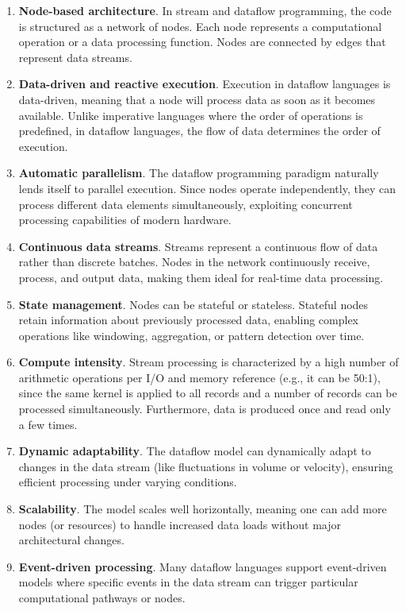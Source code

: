 \documentclass[11pt, reqno]{amsart}
\theoremstyle{definition}
\theoremstyle{remark}
\begin{document}
  \begin{enumerate}
    \item \textbf{Node-based architecture}. In stream and dataflow programming,
      the code is structured as a network of nodes. Each node represents a computational
      operation or a data processing function. Nodes are connected by edges that
      represent data streams.

    \item \textbf{Data-driven and reactive execution}. Execution in dataflow languages
      is data-driven, meaning that a node will process data as soon as it
      becomes available. Unlike imperative languages where the order of operations
      is predefined, in dataflow languages, the flow of data determines the order
      of execution.

    \item \textbf{Automatic parallelism}. The dataflow programming paradigm naturally
      lends itself to parallel execution. Since nodes operate independently, they
      can process different data elements simultaneously, exploiting concurrent
      processing capabilities of modern hardware.

    \item \textbf{Continuous data streams}. Streams represent a continuous flow of
      data rather than discrete batches. Nodes in the network continuously
      receive, process, and output data, making them ideal for real-time data processing.

    \item \textbf{State management}. Nodes can be stateful or stateless.
      Stateful nodes retain information about previously processed data, enabling
      complex operations like windowing, aggregation, or pattern detection over time.

    \item \textbf{Compute intensity}. Stream processing is characterized by a high
      number of arithmetic operations per I/O and memory reference (e.g., it can
      be 50:1), since the same kernel is applied to all records and a number of
      records can be processed simultaneously. Furthermore, data is produced
      once and read only a few times.

    \item \textbf{Dynamic adaptability}. The dataflow model can dynamically adapt
      to changes in the data stream (like fluctuations in volume or velocity),
      ensuring efficient processing under varying conditions.

    \item \textbf{Scalability}. The model scales well horizontally, meaning one
      can add more nodes (or resources) to handle increased data loads without
      major architectural changes.

    \item \textbf{Event-driven processing}. Many dataflow languages support event-driven
      models where specific events in the data stream can trigger particular computational
      pathways or nodes.
  \end{enumerate}
\end{document}
